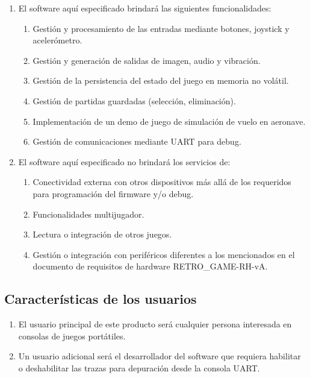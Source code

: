 \documentclass[11pt,a4paper]{article}
\begin{document}
\begin{enumerate}
  \item El software aquí especificado brindará las siguientes funcionalidades:
  \begin{enumerate}
    \item Gestión y procesamiento de las entradas mediante botones, joystick y acelerómetro.
    \item Gestión y generación de salidas de imagen, audio y vibración.
    \item Gestión de la persistencia del estado del juego en memoria no volátil.
    \item Gestión de partidas guardadas (selección, eliminación).
    \item Implementación de un demo de juego de simulación de vuelo en aeronave.
    \item Gestión de comunicaciones mediante UART para debug.
  \end{enumerate}
  \item El software aquí especificado no brindará los servicios de:
  \begin{enumerate}
    \item Conectividad externa con otros dispositivos más allá de los requeridos para programación del firmware y/o debug.
    \item Funcionalidades multijugador.
    \item Lectura o integración de otros juegos.
    \item Gestión o integración con periféricos diferentes a los mencionados en el documento de requisitos de hardware RETRO\_GAME-RH-vA.
  \end{enumerate}
\end{enumerate}

\subsection{Características de los usuarios}

\begin{enumerate}
  \item El usuario principal de este producto será cualquier persona interesada en consolas de juegos portátiles. 
  \item Un usuario adicional será el desarrollador del software que requiera habilitar o deshabilitar las trazas para depuración desde la consola UART.
\end{enumerate}
\end{document}
